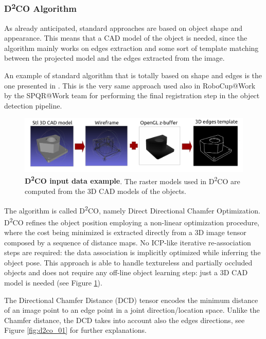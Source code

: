 \subsubsection{D\textsuperscript{2}{CO} Algorithm}\label{subsec:d2co}
As already anticipated, standard approaches are based on object shape and appearance. This means that a CAD model of the object is needed, since the algorithm mainly works on edges extraction and some sort of template matching between the projected model and the edges extracted from the image.

An example of standard algorithm that is totally based on shape and edges is the one presented in \cite{imperoli2015d2co}. This is the very same approach used also in RoboCup@Work by the SPQR@Work team for performing the final registration step in the object detection pipeline. 

\begin{figure}
    \centering
    \includegraphics[width=\textwidth]{figures/1_perception_and_sensing_in_robotics/d2co_00}
    \caption{\textbf{D\textsuperscript{2}CO input data example}. The raster models used in D\textsuperscript{2}CO are computed from the 3D CAD models of the objects.} 
    \label{fig:d2co_00}
\end{figure}

The algorithm is called D\textsuperscript{2}{CO}, namely Direct Directional Chamfer Optimization. D\textsuperscript{2}CO refines the object position employing a non-linear optimization procedure, where the cost being minimized is extracted directly from a 3D image tensor composed by a sequence of distance maps. No ICP-like iterative re-association steps are required: the data association is implicitly optimized while inferring the object pose. This approach is able to handle textureless and partially occluded objects and does not require any off-line object learning step: just a 3D CAD model is needed (see Figure \ref{fig:d2co_00}).

The Directional Chamfer Distance (DCD) tensor encodes the minimum distance of an image point to an edge point in a joint direction/location space. Unlike the Chamfer distance, the DCD takes into account also the edges directions, see Figure \ref{fig:d2co_01} for further explanations.

